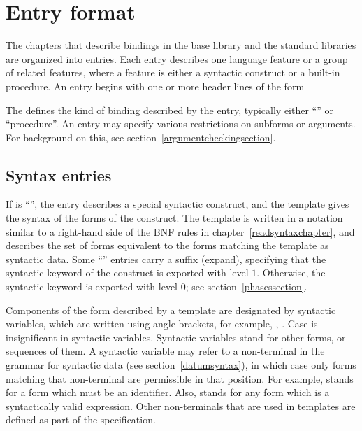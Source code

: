 \chapter{Entry format}
\label{entryformatchapter}

The chapters that describe bindings in the base library and the standard
libraries are organized
into entries.  Each entry describes one language feature or a group of
related features, where a feature is either a syntactic construct or a
built-in procedure.  An entry begins with one or more header lines of the form

\noindent{}\unpenalty

The  defines the kind of binding described by the entry,
typically either ``\exprtype'' or ``procedure''.
An entry may specify various restrictions on subforms or arguments.
For background on this, see section~\ref{argumentcheckingsection}.

\section{Syntax entries}

If  is ``\exprtype'', the entry describes a 
special syntactic construct, and the template gives the syntax of the
forms of the construct.  
The template is written in a notation similar to a right-hand
side of the BNF rules in chapter~\ref{readsyntaxchapter}, and describes
the set of forms equivalent to the forms matching the
template as syntactic data.  Some ``\exprtype'' entries carry a
suffix ({\cf expand}), specifying that the syntactic keyword of the
construct is exported with level
$1$.  Otherwise, the syntactic keyword is exported with level $0$; see
section~\ref{phasessection}.

Components of the form described by a template are designated
by syntactic variables, which are written using angle brackets, for
example, , .  Case is insignificant
in syntactic variables.  Syntactic variables
stand for other forms, or
sequences of them.  A syntactic variable may refer to a non-terminal
in the grammar for syntactic data (see section~\ref{datumsyntax}),
in which case only forms matching
that non-terminal are permissible in that position.
For example,  stands for a form which must be an
identifier.
Also,
 stands for any form which is a
syntactically valid expression.  Other non-terminals that are used in
templates are defined as part of the specification.

